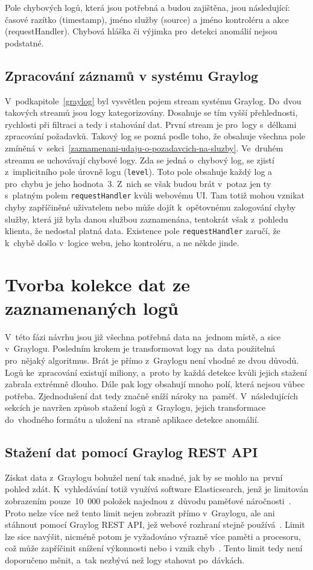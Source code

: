 Pole chybových logů, která jsou potřebná a budou zajištěna, jsou následující: časové razítko (timestamp), jméno služby (source) a jméno kontroléru a akce (requestHandler). Chybová hláška či výjimka pro~detekci anomálií nejsou podstatné.

\subsection{Zpracování záznamů v systému Graylog}
V~podkapitole~\ref{graylog} byl vysvětlen pojem stream systému Graylog. Do~dvou takových streamů jsou logy kategorizovány. Dosahuje se tím vyšší přehlednosti, rychlosti při filtraci a tedy i stahování dat. První stream je pro~logy s~délkami zpracování požadavků. Takový log se pozná podle toho, že obsahuje všechna pole zmíněná v~sekci~\ref{zaznamenani-udaju-o-pozadavcich-na-sluzby}. Ve~druhém streamu se uchovávají chybové logy. Zda se jedná o~chybový log, se zjistí z~implicitního pole úrovně logu (\texttt{level}). Toto pole obsahuje každý log a pro~chybu je jeho hodnota~3. Z~nich se však budou brát v~potaz jen ty s~platným polem \texttt{requestHandler} kvůli webovému UI. Tam totiž mohou vznikat chyby zapříčiněné uživatelem nebo může dojít k~opětovnému zalogování chyby služby, která již byla danou službou zaznamenána, tentokrát však z~pohledu klienta, že nedostal platná data. Existence pole \texttt{requestHandler} zaručí, že k~chybě došlo v~logice webu, jeho kontroléru, a ne někde jinde.

\section{Tvorba kolekce dat ze zaznamenaných logů}
V~této fázi návrhu jsou již všechna potřebná data na~jednom místě, a sice v~Graylogu. Posledním krokem je transformovat logy na~data použitelná pro~nějaký algoritmus. Brát je přímo z~Graylogu není vhodné ze dvou důvodů. Logů ke~zpracování existují miliony, a~proto by každá detekce kvůli jejich stažení zabrala extrémně dlouho. Dále pak logy obsahují mnoho polí, která nejsou vůbec potřeba. Zjednodušení dat tedy značně sníží nároky na~paměť. V~následujících sekcích je navržen způsob stažení logů z~Graylogu, jejich transformace do~vhodného formátu a uložení na~straně aplikace detekce anomálií.

\subsection{Stažení dat pomocí Graylog REST API}
Získat data z~Graylogu bohužel není tak snadné, jak by se mohlo na~první pohled zdát. K~vyhledávání totiž využívá software Elasticsearch, jenž je limitován zobrazením pouze~10~000 položek najednou z~důvodu paměťové náročnosti~\cite{graylog-limit}. Proto nelze více než tento limit nejen zobrazit přímo v~Graylogu, ale ani stáhnout pomocí Graylog REST API, jež webové rozhraní stejně používá~\cite{graylog-api}. Limit lze sice navýšit, nicméně potom je vyžadováno výrazně více paměti a procesoru, což může zapříčinit snížení výkonnosti nebo i vznik chyb~\cite{elastic-limit}. Tento limit tedy není doporučeno měnit, a~tak nezbývá než logy stahovat po~dávkách.

